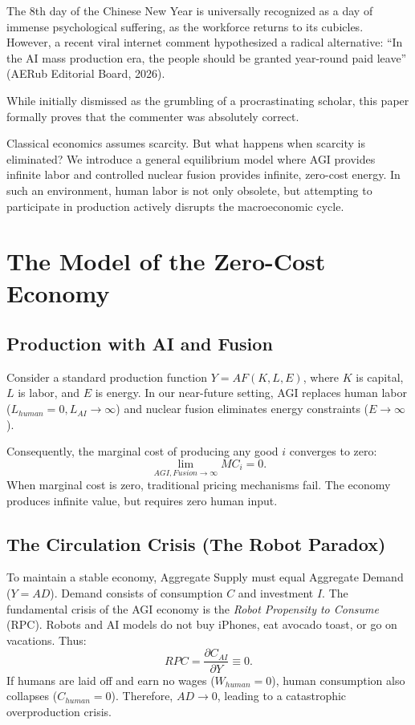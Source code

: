 \documentclass[AER]{AEA}
\begin{document}


The 8th day of the Chinese New Year is universally recognized as a day of immense psychological suffering, as the workforce returns to its cubicles. However, a recent viral internet comment hypothesized a radical alternative: ``In the AI mass production era, the people should be granted year-round paid leave'' (AERub Editorial Board, 2026). 

While initially dismissed as the grumbling of a procrastinating scholar, this paper formally proves that the commenter was absolutely correct. 

Classical economics assumes scarcity. But what happens when scarcity is eliminated? We introduce a general equilibrium model where AGI provides infinite labor and controlled nuclear fusion provides infinite, zero-cost energy. In such an environment, human labor is not only obsolete, but attempting to participate in production actively disrupts the macroeconomic cycle.

\section{The Model of the Zero-Cost Economy}

\subsection{Production with AI and Fusion}
Consider a standard production function $Y = A F(K, L, E)$, where $K$ is capital, $L$ is labor, and $E$ is energy.
In our near-future setting, AGI replaces human labor ($L_{human} = 0, L_{AI} \to \infty$) and nuclear fusion eliminates energy constraints ($E \to \infty$). 

Consequently, the marginal cost of producing any good $i$ converges to zero:
\begin{equation}
\lim_{AGI, Fusion \to \infty} MC_i = 0.
\end{equation}
When marginal cost is zero, traditional pricing mechanisms fail. The economy produces infinite value, but requires zero human input.

\subsection{The Circulation Crisis (The Robot Paradox)}
To maintain a stable economy, Aggregate Supply must equal Aggregate Demand ($Y = AD$). Demand consists of consumption $C$ and investment $I$.
The fundamental crisis of the AGI economy is the \textit{Robot Propensity to Consume} (RPC). Robots and AI models do not buy iPhones, eat avocado toast, or go on vacations. Thus:
\begin{equation}
RPC = \frac{\partial C_{AI}}{\partial Y} \equiv 0.
\end{equation}
If humans are laid off and earn no wages ($W_{human} = 0$), human consumption also collapses ($C_{human} = 0$). Therefore, $AD \to 0$, leading to a catastrophic overproduction crisis. 
\end{document}
